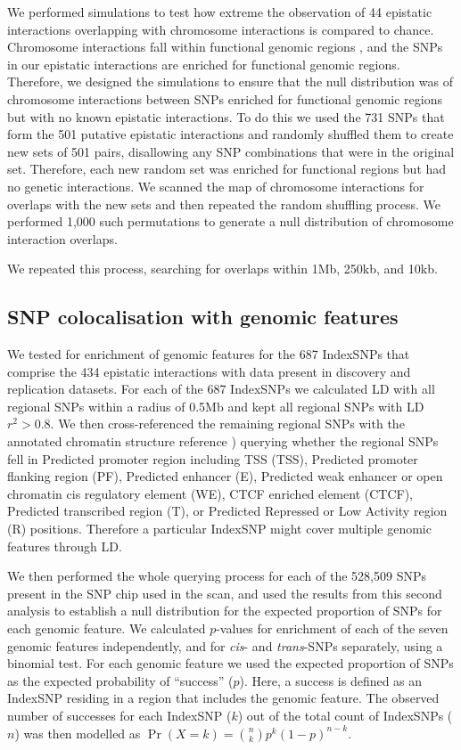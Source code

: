 \documentclass{article}
\begin{document}
We performed simulations to test how extreme the observation of 44 epistatic interactions overlapping with chromosome interactions is compared to chance. Chromosome interactions fall within functional genomic regions \cite{Lieberman-Aiden2009, Lan2012}, and the SNPs in our epistatic interactions are enriched for functional genomic regions. Therefore, we designed the simulations to ensure that the null distribution was of chromosome interactions between SNPs enriched for functional genomic regions but with no known epistatic interactions. To do this we used the 731 SNPs that form the 501 putative epistatic interactions and randomly shuffled them to create new sets of 501 pairs, disallowing any SNP combinations that were in the original set. Therefore, each new random set was enriched for functional regions but had no genetic interactions. We scanned the map of chromosome interactions for overlaps with the new sets and then repeated the random shuffling process. We performed 1,000 such permutations to generate a null distribution of chromosome interaction overlaps.

We repeated this process, searching for overlaps within 1Mb, 250kb, and 10kb.


\subsection{SNP colocalisation with genomic features}
\label{sub:snp_colocalisation_with_genomic_features}

We tested for enrichment of genomic features for the 687 IndexSNPs that comprise the 434 epistatic interactions with data present in discovery and replication datasets. For each of the 687 IndexSNPs we calculated LD with all regional SNPs within a radius of 0.5Mb and kept all regional SNPs with LD $r^{2} > 0.8$. We then cross-referenced the remaining regional SNPs with the annotated chromatin structure reference \cite{Hoffman2012}) querying whether the regional SNPs fell in Predicted promoter region including TSS (TSS), Predicted promoter flanking region (PF), Predicted enhancer (E), Predicted weak enhancer or open chromatin cis regulatory element (WE), CTCF enriched element (CTCF), Predicted transcribed region (T), or Predicted Repressed or Low Activity region (R) positions. Therefore a particular IndexSNP might cover multiple genomic features through LD.

We then performed the whole querying process for each of the 528,509 SNPs present in the SNP chip used in the scan, and used the results from this second analysis to establish a null distribution for the expected proportion of SNPs for each genomic feature. We calculated $p$-values for enrichment of each of the seven genomic features independently, and for \emph{cis}- and \emph{trans}-SNPs separately, using a binomial test. For each genomic feature we used the expected proportion of SNPs as the expected probability of ``success'' ($p$). Here, a success is defined as an IndexSNP residing in a region that includes the genomic feature. The observed number of successes for each IndexSNP ($k$) out of the total count of IndexSNPs ($n$) was then modelled as $\Pr (X = k) = {n \choose k} p^{k}(1-p)^{n-k}$.
\end{document}
